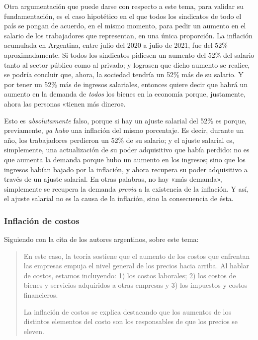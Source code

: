 \documentclass[12pt,a4paper,twoside]{book}
\begin{document}
Otra argumentación que puede darse con respecto a este tema, para validar su fundamentación, es el caso hipotético en el que todos los sindicatos de todo el país se pongan de acuerdo, en el mismo momento, para pedir un aumento en el salario de los trabajadores que representan, en una única proporción. La inflación acumulada en Argentina, entre julio del 2020 a julio de 2021, fue del 52\% aproximadamente. Si todos los sindicatos pidiesen un aumento del 52\% del salario tanto al sector público como al privado; y lograsen que dicho aumento se realice, se podría concluir que, ahora, la sociedad tendría un 52\% más de su salario. Y por tener un 52\% más de ingresos salariales, entonces quiere decir que habrá un aumento en la demanda de \textit{todos} los bienes en la economía porque, justamente, ahora las personas «tienen más dinero».

Esto es \textit{absolutamente} falso, porque si hay un ajuste salarial del 52\% es porque, previamente, \textit{ya hubo} una inflación del mismo porcentaje. Es decir, durante un año, los trabajadores perdieron un 52\% de su salario; y el ajuste salarial es, simplemente, una actualización de su poder adquisitivo que había perdido: no es que aumenta la demanda porque hubo un aumento en los ingresos; sino que los ingresos habían bajado por la inflación, y ahora recupera su poder adquisitivo a través de un ajuste salarial. En otras palabras, no hay «más demanda», simplemente se recupera la demanda \textit{previa} a la existencia de la inflación. Y así, el ajuste salarial no es la causa de la inflación, sino la consecuencia de ésta.

\subsubsection{Inflación de costos}
Siguiendo con la cita de los autores argentinos, sobre este tema:

\begin{quotation}
En este caso, la teoría sostiene que el aumento de los costos que enfrentan las empresas empuja el nivel general de los precios hacia arriba. Al hablar de costos, estamos incluyendo: 1) los costos laborales; 2) los costos de bienes y servicios adquiridos a otras empresas y 3) los impuestos y costos financieros.

La inflación de costos se explica destacando que los aumentos de los distintos elementos del costo son los responsables de que los precios se eleven. \cite[pág. 466]{elementos-econopol}
\end{quotation}
\end{document}
